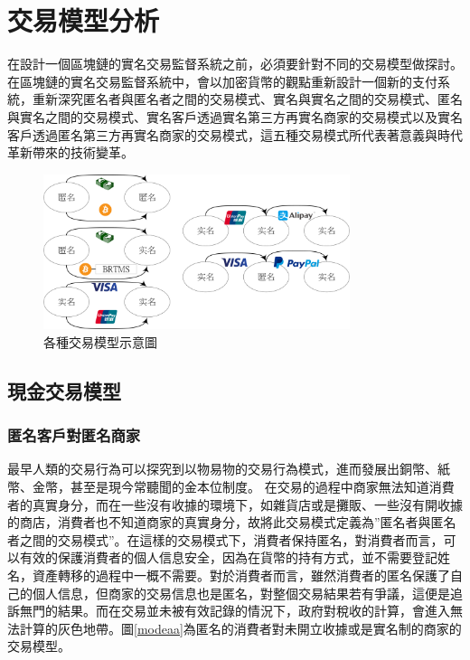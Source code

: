 
\chapter{交易模型分析}
在設計一個區塊鏈的實名交易監督系統之前，必須要針對不同的交易模型做探討。
在區塊鏈的實名交易監督系統中，會以加密貨幣的觀點重新設計一個新的支付系統，重新深究匿名者與匿名者之間的交易模式、實名與實名之間的交易模式、匿名與實名之間的交易模式、實名客戶透過實名第三方再實名商家的交易模式以及實名客戶透過匿名第三方再實名商家的交易模式，這五種交易模式所代表著意義與時代革新帶來的技術變革。
\begin{figure}[h]
	\centering
	\includegraphics[width = 0.8\textwidth]{modeall.png}
	\caption{各種交易模型示意圖}\label{modeall}
\end{figure}

	\section{現金交易模型}
		\subsection{匿名客戶對匿名商家}最早人類的交易行為可以探究到以物易物的交易行為模式，進而發展出銅幣、紙幣、金幣，甚至是現今常聽聞的金本位制度。 
		在交易的過程中商家無法知道消費者的真實身分，而在一些沒有收據的環境下，如雜貨店或是攤販、一些沒有開收據的商店，消費者也不知道商家的真實身分，故將此交易模式定義為”匿名者與匿名者之間的交易模式”。在這樣的交易模式下，消費者保持匿名，對消費者而言，可以有效的保護消費者的個人信息安全，因為在貨幣的持有方式，並不需要登記姓名，資產轉移的過程中一概不需要。對於消費者而言，雖然消費者的匿名保護了自己的個人信息，但商家的交易信息也是匿名，對整個交易結果若有爭議，這便是追訴無門的結果。而在交易並未被有效記錄的情況下，政府對稅收的計算，會進入無法計算的灰色地帶。圖\ref{modeaa}為匿名的消費者對未開立收據或是實名制的商家的交易模型。

